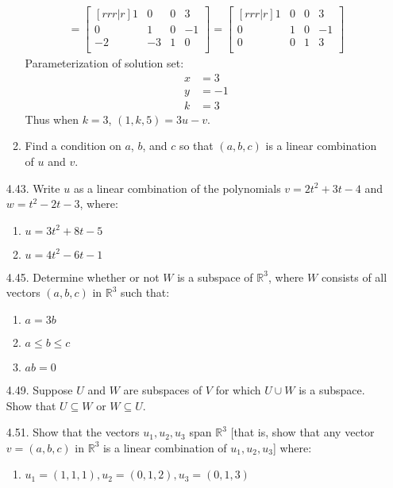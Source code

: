 \documentclass[12pt]{article}
\begin{document}
\begin{enumerate}
\begin{enumerate}
\begin{align*}
		= \begin{bmatrix}[rrr|r] 1&0&0&3\\0&1&0&-1\\-2&-3&1&0\\ \end{bmatrix}
		= \begin{bmatrix}[rrr|r] 1&0&0&3\\0&1&0&-1\\0&0&1&3\\ \end{bmatrix}
		\end{align*}
		Parameterization of solution set:
		\begin{align*}
		x&=3\\ y&= -1\\ k&= 3
		\end{align*}
		Thus when $k=3$, $(1,k,5) = 3u-v$.		
		
		
	\item Find a condition on $a$, $b$, and $c$ so that $(a,b,c)$ is a linear combination of $u$ and $v$.
	\end{enumerate}
	
\item[4.43.] Write $u$ as a linear combination of the polynomials $v=2t^2+3t-4$ and $w=t^2-2t-3$, where:
	\begin{enumerate}
	\item $u=3t^2+8t-5$

	\item $u=4t^2-6t-1$
	\end{enumerate}
	
\item[4.45.] Determine whether or not $W$ is a subspace of $\mathbb{R}^3$, where $W$ consists of all vectors $(a,b,c)$ in $\mathbb{R}^3$ such that:
	\begin{enumerate}
	\item $a=3b$

	\item $a \leq b \leq c$

	\item $ab=0$
	\end{enumerate}

\item[4.49.] Suppose $U$ and $W$ are subspaces of $V$ for which $U \cup W$ is a subspace. Show that $U \subseteq W$ or $W \subseteq U$.

\item[4.51.] Show that the vectors $u_1,u_2,u_3$ span $\mathbb{R}^3$ [that is, show that any vector $v=(a,b,c)$ in $\mathbb{R}^3$ is a linear combination of $u_1,u_2,u_3$] where:
	\begin{enumerate}
	\item $u_1=(1,1,1),u_2=(0,1,2),u_3=(0,1,3)$
	

\end{enumerate}
\end{enumerate}
\end{document}
